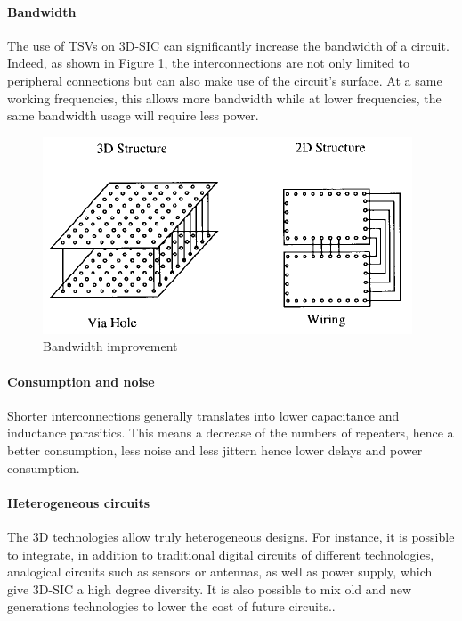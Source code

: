 \paragraph{Bandwidth}

The use of TSVs on 3D-SIC can significantly increase the bandwidth of a circuit. Indeed, as shown in Figure \ref{fig:bandwidth}, the interconnections are not only limited to peripheral connections but can also make use of the circuit's surface. At a same working frequencies, this allows more bandwidth while at lower frequencies, the same bandwidth usage will require less power.

\begin{figure}[h!]
\begin{center}
\includegraphics[width=0.75\linewidth]{bandwidth.png}
\end{center}
\vspace{-0.5cm}
\caption{Bandwidth improvement \cite{659500}}
\label{fig:bandwidth}
\end{figure}

\paragraph{Consumption and noise}

Shorter interconnections generally translates into lower capacitance and inductance parasitics. This means a decrease of the numbers of repeaters, hence a better consumption, less noise and less jittern hence lower delays and power consumption.

\paragraph{Heterogeneous circuits}

The 3D technologies allow truly heterogeneous designs. For instance, it is possible to integrate, in addition to traditional digital circuits of different technologies, analogical circuits such as sensors or antennas, as well as power supply, which give 3D-SIC a high degree diversity. It is also possible to mix old and new generations technologies to lower the cost of future circuits.\cite{4299568}.

